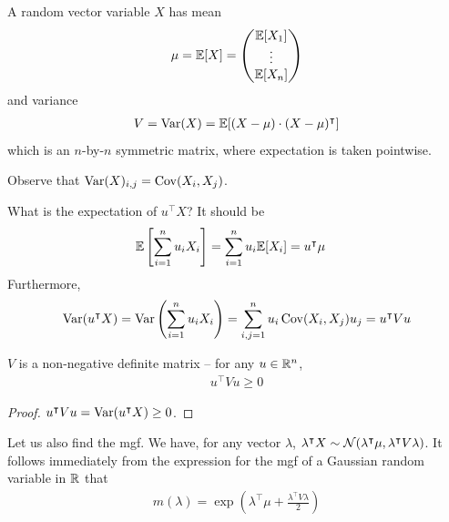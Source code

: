 \documentclass{../template/note}
\begin{document}
    \begin{definition}
        A random vector variable \(X\) has mean
        \begin{align*}
            \mu = \mathbb E[X] = \begin{pmatrix}
             \mathbb E[X_1] \\
             \vdots \\
             \mathbb E[X_n] \\
            \end{pmatrix}   
        \end{align*}
        and variance
        \begin{align*}
            V = \operatorname{Var}(X) = \mathbb E[(X-\mu) \cdot (X-\mu)^\intercal]
        \end{align*}
        which is an \(n\)-by-\(n\) symmetric matrix, where expectation is taken pointwise.
    \end{definition}
    
    \begin{remark*}
        Observe that \(\operatorname{Var}(X)_{i,j} = \operatorname{Cov}(X_i, X_j)\).
    \end{remark*}
    

    What is the expectation of \(u^\intercal X\)? It should be
    \begin{align*}
        \mathbb E\left[\sum_{i=1}^n u_iX_i\right] &= \sum_{i=1}^n u_i\mathbb E[X_i] = u^\intercal \mu
    \end{align*}
    Furthermore,
    \begin{align*}
        \operatorname{Var}(u^\intercal X) = \operatorname{Var}\left(\sum_{i=1}^n u_iX_i\right) = \sum_{i,j=1}^n u_i \operatorname{Cov}(X_i, X_j) u_j = u^\intercal V u
    \end{align*}
    
    \begin{proposition}
        \(V\) is a non-negative definite matrix -- for any \(u \in \mathbb R^n\),
        \begin{align*}
            u^\intercal V u \geq 0
        \end{align*}
    \end{proposition}
    
    \begin{proof}
        \(u^\intercal V u = \operatorname{Var}(u^\intercal X) \geq 0\).
    \end{proof}
    
    Let us also find the mgf. We have, for any vector \(\lambda\), \(\lambda^\intercal X \sim \mathcal{N}(\lambda^\intercal \mu, \lambda^\intercal V \lambda)\). It follows immediately from the expression for the mgf of a Gaussian random variable in \(\mathbb R\) that 
    \begin{align*}
        m(\lambda) = \exp\left(\lambda^\intercal \mu + \frac{\lambda^\intercal V \lambda} 2\right)
    \end{align*}
    
\end{document}
